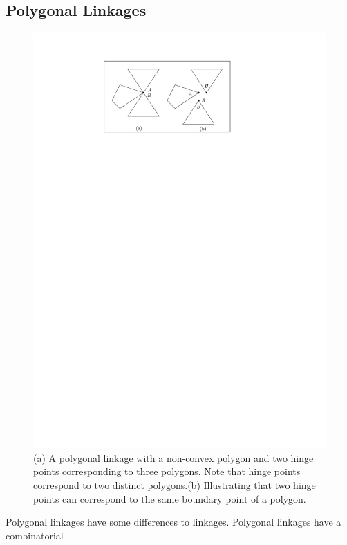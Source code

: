\subsection{Polygonal Linkages}
\begin{figure}[h]
\begin{center}
\includegraphics[scale=1]{graphics/hingeOnThreeDistinctPolygons.pdf}
\end{center} 
\caption{(a) A polygonal linkage with a non-convex polygon and two hinge points corresponding to 
three polygons.  Note that hinge points correspond to two distinct polygons.(b) Illustrating that 
two hinge points can correspond to the same boundary point of a polygon.}
\label{fig:linkage-1}
\end{figure}
Polygonal linkages have some differences to linkages.  Polygonal linkages have a combinatorial 
